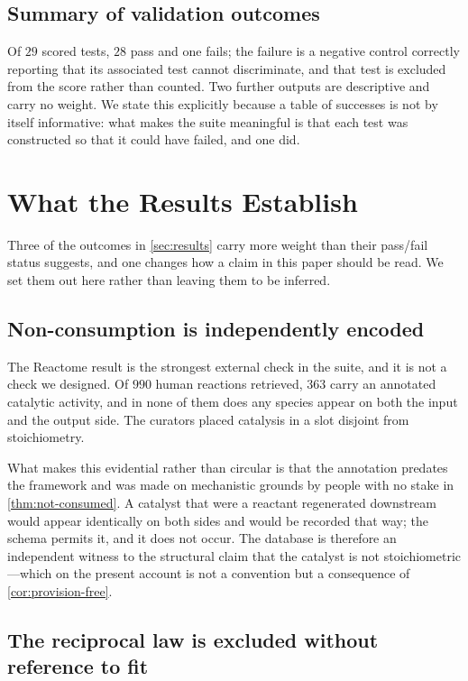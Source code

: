 \documentclass[11pt,twocolumn,a4paper]{article}
\theoremstyle{plain}
\theoremstyle{definition}
\theoremstyle{remark}
\begin{document}
\subsection*{Summary of validation outcomes}

Of $29$ scored tests, $28$ pass and one fails; the failure is a negative
control correctly reporting that its associated test cannot discriminate, and
that test is excluded from the score rather than counted. Two further outputs
are descriptive and carry no weight. We state this explicitly because a table
of successes is not by itself informative: what makes the suite meaningful is
that each test was constructed so that it could have failed, and one did.

\section{What the Results Establish}
\label{sec:what-results-establish}

Three of the outcomes in \cref{sec:results} carry more weight than their
pass/fail status suggests, and one changes how a claim in this paper should be
read. We set them out here rather than leaving them to be inferred.

\subsection{Non-consumption is independently encoded}

The Reactome result is the strongest external check in the suite, and it is
not a check we designed. Of $990$ human reactions retrieved, $363$ carry an
annotated catalytic activity, and in none of them does any species appear on
both the input and the output side. The curators placed catalysis in a slot
disjoint from stoichiometry.

What makes this evidential rather than circular is that the annotation
predates the framework and was made on mechanistic grounds by people with no
stake in \cref{thm:not-consumed}. A catalyst that were a reactant regenerated
downstream would appear identically on both sides and would be recorded that
way; the schema permits it, and it does not occur. The database is therefore an
independent witness to the structural claim that the catalyst is not
stoichiometric---which on the present account is not a convention but a
consequence of \cref{cor:provision-free}.

\subsection{The reciprocal law is excluded without reference to fit}
\end{document}

